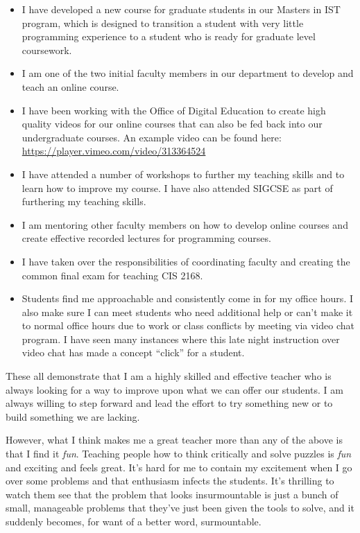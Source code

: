 \documentclass[10pt]{article}
\begin{document}
\begin{itemize}
	 
	\item I have  developed a new course for graduate students in our Masters in IST program, which is designed to transition a student with very little programming experience to a student who is ready for graduate level coursework.
	\item I am one of the two initial faculty members in our department to develop and teach an online course.
	\item I have been working with the Office of Digital Education to create high quality videos for our online courses that can also be fed back into our undergraduate courses.  An example video can be found here: \url{https://player.vimeo.com/video/313364524}
	\item I have attended a number of workshops to further my teaching skills and to learn how to improve my course.  I have also attended SIGCSE as part of furthering my teaching skills.
	\item I am mentoring other faculty members on how to develop online courses and create effective recorded lectures for programming courses.
	\item I have taken over the responsibilities of coordinating faculty  and creating the common  final exam for teaching CIS 2168.
	\item Students find me approachable and consistently come in for my office hours.  I also make sure I can meet students who need additional help or can't make it to normal office hours due to work or class conflicts by  meeting via video chat program.   I have seen many instances where this late night instruction over video chat has made a concept ``click'' for a student.
\end{itemize}


These all demonstrate that I am a highly skilled and effective teacher who is always looking for a way to improve upon what we can offer our students. I am always willing to step forward and lead the effort to try something new or to build something we are lacking.

However, what I think makes me a great teacher more than any of the above is that I find it \textit{fun}.  
Teaching people how to think critically and solve puzzles is \textit{fun} and exciting and feels great.
It's hard for me to contain my excitement when I go  over some problems and that enthusiasm infects the students.
It's thrilling to watch them see that the problem that looks insurmountable is just a bunch of small, manageable problems that they've just been given the tools to solve,  and it suddenly becomes, for want of a better word, surmountable.
\end{document}
